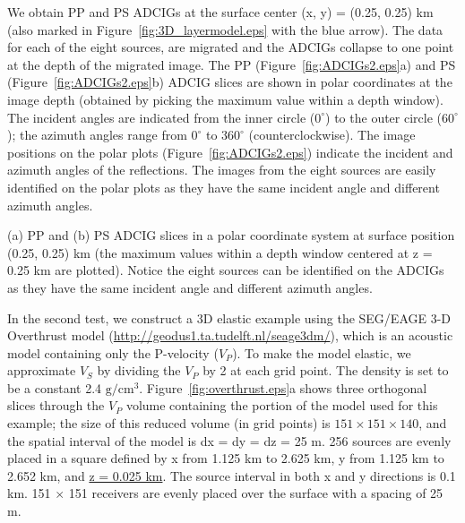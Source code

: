\documentclass[manuscript,ulem,graphix,revised]{geophysics}
\begin{document}
We obtain PP and PS ADCIGs at the surface center (x, y) = (0.25, 0.25) km (also marked in Figure~\ref{fig:3D_layermodel.eps} with the blue arrow).  The data for each of the eight sources, are migrated and the ADCIGs collapse to one point at the depth of the migrated image. 
The PP (Figure~\ref{fig:ADCIGs2.eps}a) and PS (Figure~\ref{fig:ADCIGs2.eps}b) ADCIG slices are shown in polar coordinates at the image depth (obtained by picking the maximum value within a depth window). The incident angles are indicated from the inner circle ($0^{\circ}$) to the outer circle ($60^{\circ}$); the azimuth angles range from $0^{\circ}$ to $360^{\circ}$ (counterclockwise). The image positions on the polar plots (Figure~\ref{fig:ADCIGs2.eps}) indicate the incident and azimuth angles of the reflections. The images from the eight sources are easily identified on the polar plots as they have the same incident angle and different azimuth angles. 


{
(a) PP and (b) PS ADCIG slices in a polar coordinate system at surface position (0.25, 0.25) km (the maximum values within a depth window centered at z = 0.25 km are plotted).  Notice the eight sources can be identified on the ADCIGs as they have the same incident angle and different azimuth angles.
}

In the second test, we construct a 3D elastic example using the SEG/EAGE 3-D Overthrust model (\url{http://geodus1.ta.tudelft.nl/seage3dm/}), which is an acoustic model containing only the P-velocity ($V_{P}$). To make the model elastic, we approximate $V_{S}$ by dividing the $V_{P}$ by 2 at each grid point.  The density is set to be a constant 2.4 $\mathrm{g/cm^3}$. Figure~\ref{fig:overthrust.eps}a shows three orthogonal slices through the $V_{P}$ volume containing the portion of the model used for this example; the size of this reduced volume (in grid points) is $151\times 151 \times 140$, and the spatial interval of the model is dx = dy = dz = 25 m. 256 sources are evenly placed in a square defined by x from 1.125 km to 2.625 km, y from 1.125 km to 2.652 km, and \marginpar{[15]}\uline{z = 0.025 km}. The source interval in both x and y directions is 0.1 km. 151 $\times$ 151 receivers are evenly placed over the surface with a spacing of 25 m.
\end{document}
